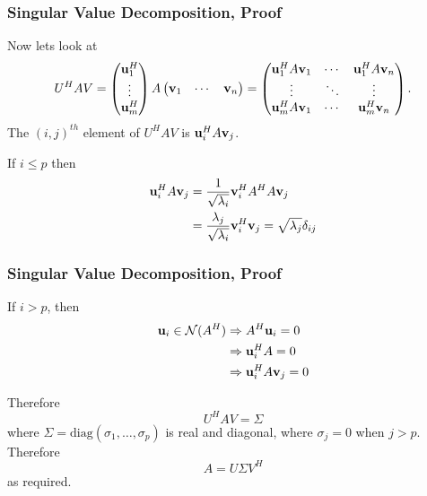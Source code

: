 \documentclass{beamer}
\begin{document}
\begin{frame}\frametitle{Singular Value Decomposition, Proof}
	Now lets look at
	\[ 
		U^HAV 
			= \begin{pmatrix}
	    		\mathbf{u}_1^H\\
	    		\vdots\\
	    		\mathbf{u}_m^H
	  		  \end{pmatrix}
	  		  A
	  		  \begin{pmatrix}
	    		\mathbf{v}_1 & \cdots & \mathbf{v}_n
	  		  \end{pmatrix} 
	  		= \begin{pmatrix}
	    		\mathbf{u}_1^HA\mathbf{v}_1 & \cdots & \mathbf{u}_1^HA\mathbf{v}_n\\
	    		\vdots & \ddots & \vdots\\
	    		\mathbf{u}_m^HA\mathbf{v}_1 & \cdots & \mathbf{u}_m^H\mathbf{v}_n
	  		  \end{pmatrix}.
	\]
	The $(i,j)^{th}$ element of $U^HAV$ is $\mathbf{u}_i^HA\mathbf{v}_j$.
	
	\vfill
	
	If $i \leq p$ then
	\begin{align*}
		\mathbf{u}_i^HA\mathbf{v}_j 
			&= \frac{1}{\sqrt{\lambda_i}}\mathbf{v}_i^HA^HA\mathbf{v}_j\\
			&= \frac{\lambda_j}{\sqrt{\lambda_i}}\mathbf{v}_i^H\mathbf{v}_j = \sqrt{\lambda_j}\delta_{ij}
	\end{align*}
\end{frame}

\begin{frame}\frametitle{Singular Value Decomposition, Proof}
	\begin{proofend}
		If $i > p$, then 
		\begin{align*}
			\mathbf{u}_i \in \mathcal{N}(A^H) &\Rightarrow A^H\mathbf{u}_i = 0 \\
			&\Rightarrow \mathbf{u}_i^HA = 0\\
			&\Rightarrow \mathbf{u}_i^H A \mathbf{v}_j = 0
		\end{align*}
		
		Therefore 
		\[
			U^HAV = \Sigma
		\]
		where $\Sigma = \text{diag}(\sigma_1, \ldots, \sigma_p)$ is real and diagonal, where $\sigma_j = 0$ when $j > p$.  Therefore
		\[
			A = U\Sigma V^H
		\] 
		as required.		
	\end{proofend}
\end{frame}
\end{document}
